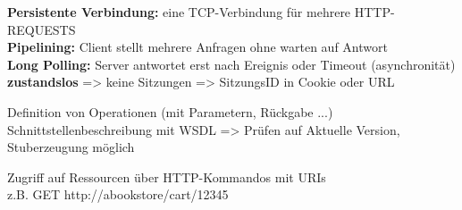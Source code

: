 


\textbf{Persistente Verbindung:} eine TCP-Verbindung für mehrere HTTP-REQUESTS\\
\textbf{Pipelining:} Client stellt mehrere Anfragen ohne warten auf Antwort \\
\textbf{Long Polling:} Server antwortet erst nach Ereignis oder Timeout (asynchronität)\\
\textbf{zustandslos} => keine Sitzungen => SitzungsID in Cookie oder URL


Definition von Operationen (mit Parametern, Rückgabe ...)\\
Schnittstellenbeschreibung mit WSDL => Prüfen auf Aktuelle Version, Stuberzeugung möglich

Zugriff auf Ressourcen über HTTP-Kommandos mit URIs\\
z.B. GET http://abookstore/cart/12345

